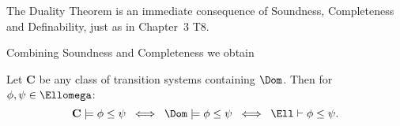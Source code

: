 The Duality Theorem is an immediate consequence of Soundness, Completeness and Definability, just as in Chapter~3 T8.

Combining Soundness and Completeness we obtain
\begin{theorem}
Let {\bf C} be any class of transition systems containing $\Dom$.
Then for $\phi , \psi \in \Ellomega$:
\[ {\bf C}  \models \phi \leq \psi \;\; \Longleftrightarrow \;\; \Dom  \models  \phi \leq \psi \;\; \Longleftrightarrow \;\; \Ell  \vdash  \phi \leq \psi . \]
\end{theorem}


